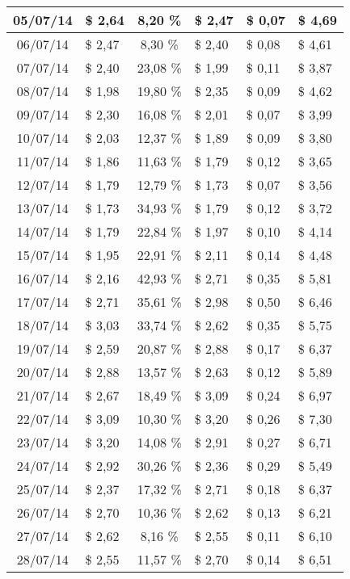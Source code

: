 \begin{center}
\begin{small}
\begin{longtable}{|c|l|c|l|l|l|}
05/07/14 & \$ 2,64 & 8,20 \% & \$ 2,47 & \$ 0,07 & \$ 4,69 \\ \hline
06/07/14 & \$ 2,47 & 8,30 \% & \$ 2,40 & \$ 0,08 & \$ 4,61 \\ \hline
07/07/14 & \$ 2,40 & 23,08 \% & \$ 1,99 & \$ 0,11 & \$ 3,87 \\ \hline
08/07/14 & \$ 1,98 & 19,80 \% & \$ 2,35 & \$ 0,09 & \$ 4,62 \\ \hline
09/07/14 & \$ 2,30 & 16,08 \% & \$ 2,01 & \$ 0,07 & \$ 3,99 \\ \hline
10/07/14 & \$ 2,03 & 12,37 \% & \$ 1,89 & \$ 0,09 & \$ 3,80 \\ \hline
11/07/14 & \$ 1,86 & 11,63 \% & \$ 1,79 & \$ 0,12 & \$ 3,65 \\ \hline
12/07/14 & \$ 1,79 & 12,79 \% & \$ 1,73 & \$ 0,07 & \$ 3,56 \\ \hline
13/07/14 & \$ 1,73 & 34,93 \% & \$ 1,79 & \$ 0,12 & \$ 3,72 \\ \hline
14/07/14 & \$ 1,79 & 22,84 \% & \$ 1,97 & \$ 0,10 & \$ 4,14 \\ \hline
15/07/14 & \$ 1,95 & 22,91 \% & \$ 2,11 & \$ 0,14 & \$ 4,48 \\ \hline
16/07/14 & \$ 2,16 & 42,93 \% & \$ 2,71 & \$ 0,35 & \$ 5,81 \\ \hline
17/07/14 & \$ 2,71 & 35,61 \% & \$ 2,98 & \$ 0,50 & \$ 6,46 \\ \hline
18/07/14 & \$ 3,03 & 33,74 \% & \$ 2,62 & \$ 0,35 & \$ 5,75 \\ \hline
19/07/14 & \$ 2,59 & 20,87 \% & \$ 2,88 & \$ 0,17 & \$ 6,37 \\ \hline
20/07/14 & \$ 2,88 & 13,57 \% & \$ 2,63 & \$ 0,12 & \$ 5,89 \\ \hline
21/07/14 & \$ 2,67 & 18,49 \% & \$ 3,09 & \$ 0,24 & \$ 6,97 \\ \hline
22/07/14 & \$ 3,09 & 10,30 \% & \$ 3,20 & \$ 0,26 & \$ 7,30 \\ \hline
23/07/14 & \$ 3,20 & 14,08 \% & \$ 2,91 & \$ 0,27 & \$ 6,71 \\ \hline
24/07/14 & \$ 2,92 & 30,26 \% & \$ 2,36 & \$ 0,29 & \$ 5,49 \\ \hline
25/07/14 & \$ 2,37 & 17,32 \% & \$ 2,71 & \$ 0,18 & \$ 6,37 \\ \hline
26/07/14 & \$ 2,70 & 10,36 \% & \$ 2,62 & \$ 0,13 & \$ 6,21 \\ \hline
27/07/14 & \$ 2,62 & 8,16 \% & \$ 2,55 & \$ 0,11 & \$ 6,10 \\ \hline
28/07/14 & \$ 2,55 & 11,57 \% & \$ 2,70 & \$ 0,14 & \$ 6,51 \\ \hline

\end{longtable}
\end{small}
\end{center}
